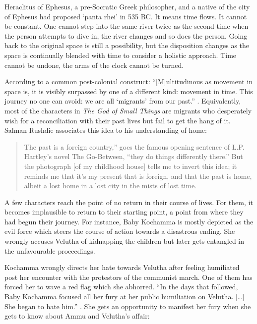 Heraclitus of Ephesus, a pre-Socratic Greek philosopher, and a native of the city of Ephesus had proposed `panta rhei' in 535 BC. It means time flows. It cannot be constant. One cannot step into the same river twice as the second time when the person attempts to dive in, the river changes and so does the person. Going back to the original space is still a possibility, but the disposition changes as the space is continually blended with time to consider a holistic approach. Time cannot be undone, the arms of the clock cannot be turned. 

According to a common post-colonial construct: ``[M]ultitudinous as movement in space is, it is visibly surpassed by one of a different kind: movement in time. This journey no one can avoid: we are all `migrants' from our past.'' \parencite[164]{Santaollalla1994}. Equivalently, most of the characters in \emph{The God of Small Things} are migrants who desperately wish for a reconciliation with their past lives but fail to get the hang of it. Salman Rushdie associates this idea to his understanding of home:

\begin{quote}
  The past is a foreign country,'' goes the famous opening sentence of L.P. Hartley's novel The Go-Between, ``they do things differently there.'' But the photograph [of my childhood house] tells me to invert this idea; it reminds me that it's my present that is foreign, and that the past is home, albeit a lost home in a lost city in the mists of lost time. \parencite[9]{Rushdie2006} 
\end{quote}

A few characters reach the point of no return in their course of lives.  For them, it becomes implausible to return to their starting point, a point from where they had begun their journey. For instance, Baby Kochamma is mostly depicted as the evil force which steers the course of action towards a disastrous ending. She wrongly accuses Velutha of kidnapping the children but later gets entangled in the unfavourable proceedings. 

Kochamma wrongly directs her hate towards Velutha after feeling humiliated post her encounter with the protestors of the communist march. One of them has forced her to wave a red flag which she abhorred. ``In the days that followed, Baby Kochamma focused all her fury at her public humiliation on Velutha. [\ldots] She began to hate him.'' \parencite[82]{Roy1997}.
She gets an opportunity to manifest her fury when she gets to know about Ammu and Velutha's affair:

